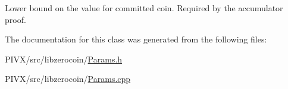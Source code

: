 Lower bound on the value for committed coin. Required by the accumulator proof. 

The documentation for this class was generated from the following files\+:\begin{DoxyCompactItemize}
\item 
P\+I\+V\+X/src/libzerocoin/\mbox{\hyperlink{_params_8h}{Params.\+h}}\item 
P\+I\+V\+X/src/libzerocoin/\mbox{\hyperlink{_params_8cpp}{Params.\+cpp}}\end{DoxyCompactItemize}
